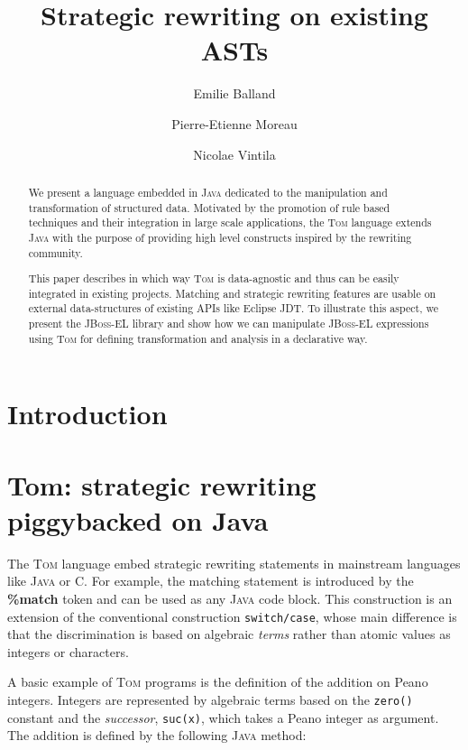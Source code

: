 \documentclass[runningheads]{llncs}
\title{Strategic rewriting on existing ASTs}
\author{Emilie Balland \and Pierre-Etienne Moreau \and Nicolae Vintila}
\institute{INRIA \& LORIA,\\
  BP 101, 54602 Villers-l{\`e}s-Nancy Cedex France\\
\email{\{Emilie.Balland,Pierre-Etienne.Moreau\}@loria.fr,nick@domainspecificconsulting.com}}
\newcommand{\jbossel}{\textsc{JBoss-EL}}
\newcommand{\tom}{\textsc{Tom}}
\newcommand{\java}{\textsc{Java}}
\newcommand{\C}{\textsf{C}}
\newcommand{\lex}[1]{{\textrm{\textbf{#1}}}}
\begin{document}
\maketitle

\begin{abstract}
We present a language embedded in {\java} dedicated to the manipulation and
transformation of structured data.  Motivated by the promotion of rule based
techniques and their integration in large scale applications, the {\tom}
language extends {\java} with the purpose of providing high level constructs
inspired by the rewriting community.

This paper describes in which way {\tom} is data-agnostic and thus can be
easily integrated in existing projects. Matching and strategic rewriting
features are usable on external data-structures of existing APIs like Eclipse
JDT. To illustrate this aspect, we present the {\jbossel} library and show how
we can manipulate {\jbossel} expressions using {\tom} for defining
transformation and analysis in a declarative way.
\end{abstract}

\section{Introduction}

\section{Tom: strategic rewriting piggybacked on Java}
	
The {\tom} language embed strategic rewriting statements in  mainstream
languages like {\java} or {\C}.  For example, the matching statement is
introduced by the \lex{\%match} token and can be used as any {\java} code
block.  This construction is an extension of the conventional construction
\texttt{switch/case}, whose main difference is that the discrimination is
based on algebraic \emph{terms} rather than atomic values as integers or
characters.

A basic example of {\tom} programs is the definition of the addition on Peano
integers. Integers are represented by algebraic terms based on the
\texttt{zero()} constant and the \emph{successor}, \texttt{suc(x)},  which
takes a Peano integer as argument.  The addition is defined by the following
{\java} method:

\medskip
{}
\end{document}
